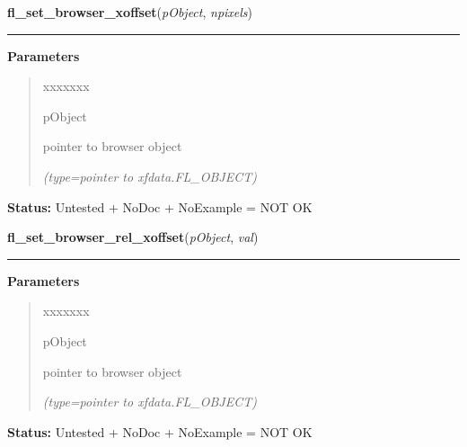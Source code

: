 \hspace{.8\funcindent}\begin{boxedminipage}{\funcwidth}

    \raggedright \textbf{fl\_set\_browser\_xoffset}(\textit{pObject}, \textit{npixels})

    \vspace{-1.5ex}

    \rule{\textwidth}{0.5\fboxrule}
\setlength{\parskip}{2ex}
\setlength{\parskip}{1ex}
      \textbf{Parameters}
      \vspace{-1ex}

      \begin{quote}
        \begin{Ventry}{xxxxxxx}

          \item[pObject]

          pointer to browser object

            {\it (type=pointer to xfdata.FL\_OBJECT)}

        \end{Ventry}

      \end{quote}

\textbf{Status:} Untested + NoDoc + NoExample = NOT OK



    \end{boxedminipage}

    \label{xformslib:library:fl_set_browser_rel_xoffset}

    \vspace{0.5ex}

\hspace{.8\funcindent}\begin{boxedminipage}{\funcwidth}

    \raggedright \textbf{fl\_set\_browser\_rel\_xoffset}(\textit{pObject}, \textit{val})

    \vspace{-1.5ex}

    \rule{\textwidth}{0.5\fboxrule}
\setlength{\parskip}{2ex}
\setlength{\parskip}{1ex}
      \textbf{Parameters}
      \vspace{-1ex}

      \begin{quote}
        \begin{Ventry}{xxxxxxx}

          \item[pObject]

          pointer to browser object

            {\it (type=pointer to xfdata.FL\_OBJECT)}

        \end{Ventry}

      \end{quote}

\textbf{Status:} Untested + NoDoc + NoExample = NOT OK



    \end{boxedminipage}

